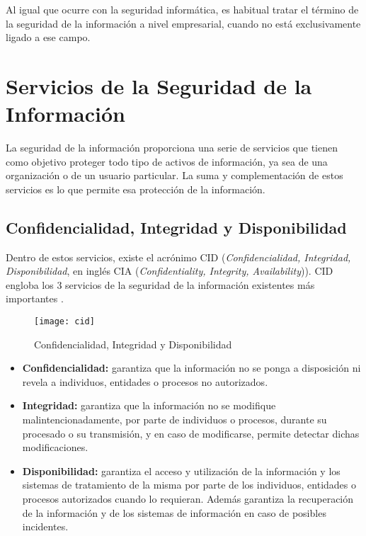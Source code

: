 Al igual que ocurre con la seguridad informática, es habitual tratar el término de la seguridad de la información a nivel empresarial, cuando no está exclusivamente ligado a ese campo.


\section{Servicios de la Seguridad de la Información}
La seguridad de la información proporciona una serie de servicios que tienen como objetivo proteger todo tipo de activos de información, ya sea de una organización o de un usuario particular. La suma y complementación de estos servicios es lo que permite esa protección de la información.

\subsection[CID]{Confidencialidad, Integridad y Disponibilidad}

Dentro de estos servicios, existe el acrónimo CID (\textit{Confidencialidad, Integridad, Disponibilidad}, en inglés CIA (\textit{Confidentiality, Integrity, Availability})). CID engloba los 3 servicios de la seguridad de la información existentes más importantes \cite{iso-27000}.

\begin{figure}[H]
	\centering
	\texttt{[image: cid]}
	\caption{Confidencialidad, Integridad y Disponibilidad}
	\label{fig:cid}
\end{figure}

\begin{itemize}
	\item \textbf{Confidencialidad:} garantiza que la información no se ponga a disposición ni revela a individuos, entidades o procesos no autorizados.
	\item \textbf{Integridad:} garantiza que la información no se modifique malintencionadamente, por parte de individuos o procesos, durante su procesado o su transmisión, y en caso de modificarse, permite detectar dichas modificaciones.
	\item \textbf{Disponibilidad:} garantiza el acceso y utilización de la información y los sistemas de tratamiento de la misma por parte de los individuos, entidades o procesos autorizados cuando lo requieran. Además garantiza la recuperación de la información y de los sistemas de información en caso de posibles incidentes.
\end{itemize}

